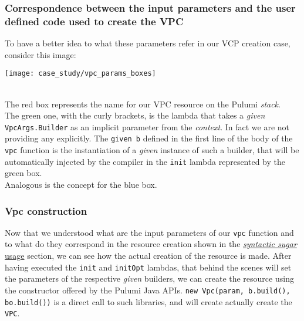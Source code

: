 \subsubsection{Correspondence between the input parameters and the user defined code used to create the VPC}
To have a better idea to what these parameters refer in our VCP creation case, consider this image:
\begin{center}
  \hspace*{-1cm}\texttt{[image: case\_study/vpc\_params\_boxes]} 
\end{center}\mbox{}\\
The red box represents the name for our VPC resource on the Pulumi \textit{stack}.\\
The green one, with the curly brackets, is the lambda that takes a \textit{given} \texttt{VpcArgs.Builder} as an implicit parameter from the \textit{context}.
In fact we are not providing any explicitly.
The \texttt{given b} defined in the first line of the body of the \texttt{vpc} function is the instantiation of a \textit{given} instance of such a builder, that will be automatically injected by the compiler in the \texttt{init} lambda represented by the green box.\\
Analogous is the concept for the blue box.\\

\subsubsection{Vpc construction}
Now that we understood what are the input parameters of our \texttt{vpc} function and to what do they correspond in the resource creation shown in the \hyperref[ssec:syn-sug-usage]{\textit{syntactic sugar} usage} section, we can see how the actual creation of the resource is made.
After having executed the \texttt{init} and \texttt{initOpt} lambdas, that behind the scenes will set the parameters of the respective \textit{given} builders, we can create the resource using the constructor offered by the Pulumi Java APIs.
\texttt{new Vpc(param, b.build(), bo.build())} is a direct call to such libraries, and will create actually create the \texttt{VPC}.

